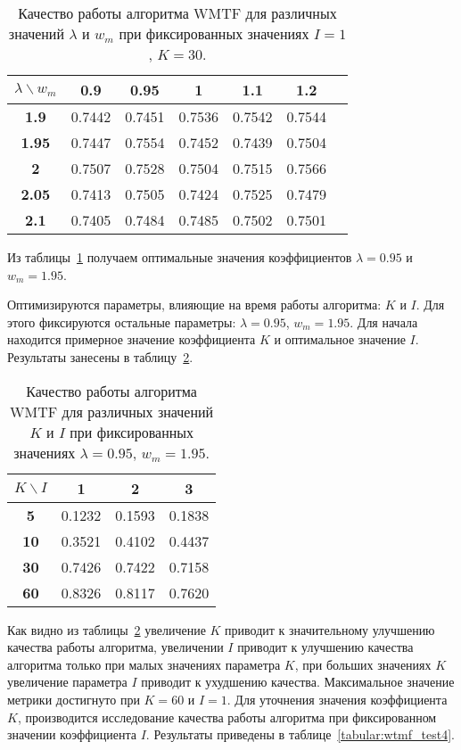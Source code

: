     \begin{table}[ht!]
        \caption{Качество работы алгоритма WMTF для различных значений $\lambda$ и $w_m$ при фиксированных значениях $I=1$, $K=30$. \bigskip}
        \centering

        \label{tabular:wtmf_test2}
        \begin{tabular}{|c|c|c|c|c|c|c|} \hline
            $\lambda \backslash w_m$ & \bf{0.9} & \bf{0.95} & \bf{1} & \bf{1.1} & \bf{1.2} \\ \hline
            \bf{1.9} & 0.7442 & 0.7451 & 0.7536 & 0.7542 & 0.7544 \\ \hline
            \bf{1.95} & 0.7447 & 0.7554 & 0.7452 & 0.7439 & 0.7504 \\ \hline
            \bf{2} & 0.7507 & 0.7528 & 0.7504 & 0.7515 & 0.7566 \\ \hline
            \bf{2.05} & 0.7413 & 0.7505 & 0.7424 & 0.7525 & 0.7479 \\ \hline
            \bf{2.1} & 0.7405 & 0.7484 & 0.7485 & 0.7502 & 0.7501 \\ \hline
        \end{tabular}
    \end{table}
    Из таблицы~\ref{tabular:wtmf_test2} получаем оптимальные значения коэффициентов $\lambda=0.95$ и $w_m=1.95$.

    Оптимизируются параметры, влияющие на время работы алгоритма: $K$ и $I$.
    Для этого фиксируются остальные параметры: $\lambda=0.95$, $w_m=1.95$.
    Для начала находится примерное значение коэффициента $K$ и оптимальное значение $I$.
    Результаты занесены в таблицу~\ref{tabular:wtmf_test3}.

    \begin{table}[ht!]
        \caption{Качество работы алгоритма WMTF для различных значений $K$ и $I$ при фиксированных значениях $\lambda=0.95$, $w_m=1.95$. \bigskip}
        \centering

        \label{tabular:wtmf_test3}
        \begin{tabular}{|c|c|c|c|} \hline
            $K \backslash I$ & \bf{1} & \bf{2} & \bf{3} \\ \hline
            \bf{5} & 0.1232 & 0.1593 & 0.1838 \\ \hline
            \bf{10} & 0.3521 & 0.4102 & 0.4437 \\ \hline
            \bf{30} & 0.7426 & 0.7422 & 0.7158 \\ \hline
            \bf{60} & 0.8326 & 0.8117 & 0.7620 \\ \hline
        \end{tabular}
    \end{table}
    Как видно из таблицы~\ref{tabular:wtmf_test3} увеличение $K$ приводит к значительному улучшению качества работы алгоритма,
    увеличении $I$ приводит к улучшению качества алгоритма только при малых значениях параметра $K$, при больших значениях $K$ увеличение параметра $I$ приводит к ухудшению качества.
    Максимальное значение метрики достигнуто при $K=60$ и $I=1$.
    Для уточнения значения коэффициента $K$, производится исследование качества работы алгоритма при фиксированном значении коэффициента $I$.
    Результаты приведены в таблице~\ref{tabular:wtmf_test4}.

